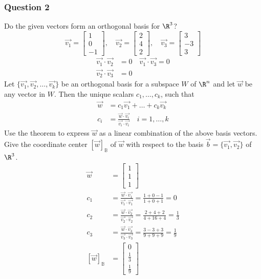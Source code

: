 \documentclass{math}
\begin{document}
\subsubsection*{Question 2}
Do the given vectors form an orthogonal basis for \( \R^3 \)?
\[ \vec{v_1} = \begin{bmatrix}1 \\ 0 \\ -1\end{bmatrix}, \quad
  \vec{v_2} = \begin{bmatrix}2 \\ 4 \\ 2\end{bmatrix},\quad
  \vec{v_3} = \begin{bmatrix}3 \\ -3 \\ 3\end{bmatrix} \]
\begin{align*}
  \vec{v_1}\cdot\vec{v_2} &= 0 \quad \vec{v_1}\cdot\vec{v_3} = 0 \\
  \vec{v_2}\cdot\vec{v_3} &= 0
\end{align*}
Let \( \{\vec{v_1},\vec{v_2},\dots,\vec{v_k}\} \) be an orthogonal basis for a
subspace \( W \) of \( \R^n \) and let \( \vec{w} \) be any vector in \( W \).
Then the unique scalars \( c_1,\dots,c_k \), such that
\begin{align*}
  \vec{w} &= c_1\vec{v_1}+\dots+c_k\vec{v_k} \\
  c_i &= \frac{\vec{w}\cdot\vec{v_i}}{\vec{v_i}\cdot\vec{v_i}} \quad
    i = 1,\dots,k
\end{align*}
Use the theorem to express \( \vec{w} \) as a linear combination of the above
basis vectors. Give the coordinate center \( [\vec{w}]_{\mathbb{B}} \) of
\( \vec{w} \) with respect to the basis \( \vec{b} = \{\vec{v_1},\vec{v_2}\} \)
of \( \R^3 \).
\begin{align*}
  \vec{w} &= \begin{bmatrix}1 \\ 1 \\ 1\end{bmatrix} \\
  c_1 &= \frac{\vec{w}\cdot\vec{v_1}}{\vec{v_1}\cdot\vec{v_1}} =
    \frac{1+0-1}{1+0+1} = 0 \\
  c_2 &= \frac{\vec{w}\cdot\vec{v_2}}{\vec{v_2}\cdot\vec{v_2}} =
    \frac{2+4+2}{4+16+4} = \frac{1}{3} \\
  c_3 &= \frac{\vec{w}\cdot\vec{v_3}}{\vec{v_3}\cdot\vec{v_3}} =
    \frac{3-3+3}{9+9+9} = \frac{1}{9} \\
  [\vec{w}]_{\mathbb{B}} &=
    \begin{bmatrix}0 \\ \frac{1}{3} \\ \frac{1}{9}\end{bmatrix}
\end{align*}
\end{document}
